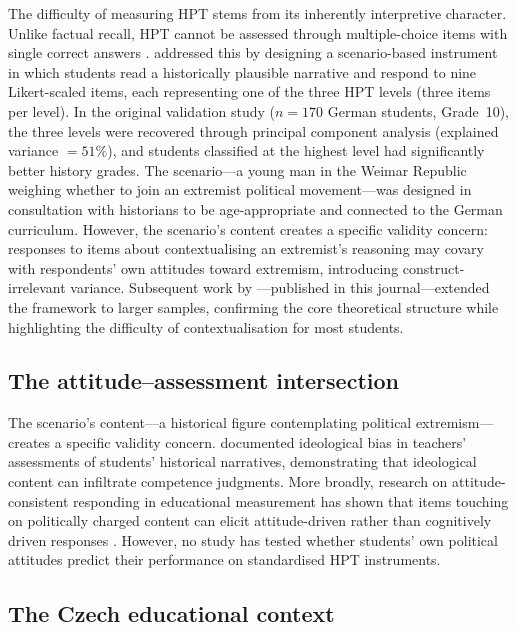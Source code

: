 \documentclass[pdflatex,sn-apa]{sn-jnl}%
\begin{document}
The difficulty of measuring HPT stems from its inherently interpretive character. Unlike factual recall, HPT cannot be assessed through multiple-choice items with single correct answers \citep{Smith2017}. \citet{Hartmann2008} addressed this by designing a scenario-based instrument in which students read a historically plausible narrative and respond to nine Likert-scaled items, each representing one of the three HPT levels (three items per level). In the original validation study ($n = 170$ German students, Grade~10), the three levels were recovered through principal component analysis (explained variance $= 51\%$), and students classified at the highest level had significantly better history grades. The scenario---a young man in the Weimar Republic weighing whether to join an extremist political movement---was designed in consultation with historians to be age-appropriate and connected to the German curriculum. However, the scenario's content creates a specific validity concern: responses to items about contextualising an extremist's reasoning may covary with respondents' own attitudes toward extremism, introducing construct-irrelevant variance. Subsequent work by \citet{Huijgen2014}---published in this journal---extended the framework to larger samples, confirming the core theoretical structure while highlighting the difficulty of contextualisation for most students.

\subsection{The attitude--assessment intersection}\label{subsec:intersection}

The scenario's content---a historical figure contemplating political extremism---creates a specific validity concern. \citet{Alven2019} documented ideological bias in teachers' assessments of students' historical narratives, demonstrating that ideological content can infiltrate competence judgments. More broadly, research on attitude-consistent responding in educational measurement has shown that items touching on politically charged content can elicit attitude-driven rather than cognitively driven responses \citep{Badham2025}. However, no study has tested whether students' own political attitudes predict their performance on standardised HPT instruments.

\subsection{The Czech educational context}\label{subsec:czech}
\end{document}
